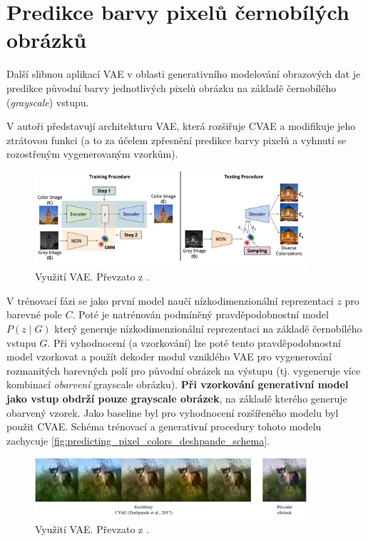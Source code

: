 \newpage
\section{Predikce barvy pixelů černobílých obrázků}
Další slibnou aplikací VAE v oblasti generativního modelování obrazových dat je predikce původní barvy jednotlivých pixelů obrázku na základě černobílého (\emph{grayscale}) vstupu.

V \cite{Deshpande2017} autoři představují architekturu VAE, která rozšiřuje CVAE a modifikuje jeho ztrátovou funkci (a to za účelem zpřesnění predikce barvy pixelů a vyhnutí se rozostřeným vygenerovaným vzorkům).
\begin{figure}[H]
    \centering
    \includegraphics[width=0.9\textwidth]{figures/applications/predicting_pixel_colors_deshpande_vae_schema.png}
    \caption{Využití VAE. Převzato z \cite{Deshpande2017}.}
    \label{fig:predicting_pixel_colors_deshpande_schema}
\end{figure}

V trénovací fázi se jako první model naučí nízkodimenzionální reprezentaci $z$ pro barevné pole $C$.
Poté je natrénován podmíněný pravděpodobnostní model $P(z \mid G)$ který generuje nízkodimenzionální reprezentaci na základě černobílého vstupu $G$. 
Při vyhodnocení (a vzorkování) lze poté tento pravděpodobnostní model vzorkovat a použít dekoder modul vzniklého VAE pro vygenerování rozmanitých barevných polí pro původní obrázek na výstupu (tj. vygeneruje více kombinací \emph{obarvení} grayscale obrázku).
\textbf{Při vzorkování generativní model jako vstup obdrží pouze grayscale obrázek}, na základě kterého generuje obarvený vzorek. Jako baseline byl pro vyhodnocení rozšířeného modelu byl použit CVAE. Schéma trénovací a generativní procedury tohoto modelu zachycuje \autoref{fig:predicting_pixel_colors_deshpande_schema}. \cite{Deshpande2017}

\begin{figure}[H]
    \centering
    \includegraphics[width=0.9\textwidth]{figures/applications/predicting_pixel_colors_deshpande.pdf}
    \caption{Využití VAE. Převzato z \cite{Deshpande2017}.}
    \label{fig:predicting_pixel_colors_deshpande}
\end{figure}

